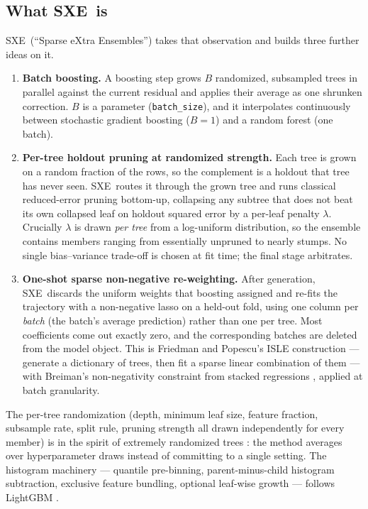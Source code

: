 \documentclass[11pt,a4paper]{article}
\newcommand{\code}[1]{\texttt{\small #1}}
\newcommand{\SXE}{\textsc{SXE}}
\theoremstyle{definition}
\begin{document}
\subsection{What \SXE\ is}

\SXE\ (``Sparse eXtra Ensembles'') takes that observation and builds three
further ideas on it.

\begin{enumerate}[leftmargin=*]
\item \textbf{Batch boosting.} A boosting step grows $B$ randomized,
subsampled trees in parallel against the current residual and applies their
average as one shrunken correction. $B$ is a parameter (\code{batch\_size}),
and it interpolates continuously between stochastic gradient boosting ($B=1$)
and a random forest (one batch).

\item \textbf{Per-tree holdout pruning at randomized strength.} Each tree is
grown on a random fraction of the rows, so the complement is a holdout that
tree has never seen. \SXE\ routes it through the grown tree and runs classical
reduced-error pruning \cite{quinlan1987rep} bottom-up, collapsing any subtree
that does not beat its own collapsed leaf on holdout squared error by a
per-leaf penalty $\lambda$. Crucially $\lambda$ is drawn \emph{per tree} from a
log-uniform distribution, so the ensemble contains members ranging from
essentially unpruned to nearly stumps. No single bias--variance trade-off is
chosen at fit time; the final stage arbitrates.

\item \textbf{One-shot sparse non-negative re-weighting.} After generation,
\SXE\ discards the uniform weights that boosting assigned and re-fits the
trajectory with a non-negative lasso on a held-out fold, using one column per
\emph{batch} (the batch's average prediction) rather than one per tree. Most
coefficients come out exactly zero, and the corresponding batches are deleted
from the model object. This is Friedman and Popescu's ISLE construction
\cite{friedman2003isle} --- generate a dictionary of trees, then fit a sparse
linear combination of them --- with Breiman's non-negativity constraint from
stacked regressions \cite{breiman1996stacked}, applied at batch granularity.
\end{enumerate}

The per-tree randomization (depth, minimum leaf size, feature fraction,
subsample rate, split rule, pruning strength all drawn independently for every
member) is in the spirit of extremely randomized trees \cite{geurts2006et}: the
method averages over hyperparameter draws instead of committing to a single
setting. The histogram machinery --- quantile pre-binning, parent-minus-child
histogram subtraction, exclusive feature bundling, optional leaf-wise growth
--- follows LightGBM \cite{ke2017lightgbm}.
\end{document}
